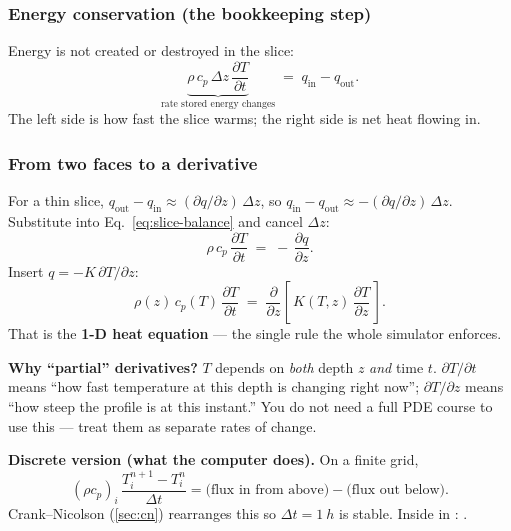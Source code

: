 \subsubsection{Energy conservation (the bookkeeping step)}

Energy is not created or destroyed in the slice:
\begin{equation}
  \underbrace{\rho\,c_p\,\Delta z\,\frac{\partial T}{\partial t}}_{\text{rate stored energy changes}}
  \;=\;
  q_\mathrm{in} - q_\mathrm{out}.
  \label{eq:slice-balance}
\end{equation}
The left side is how fast the slice warms; the right side is net heat flowing
in.

\subsubsection{From two faces to a derivative}

For a thin slice, $q_\mathrm{out} - q_\mathrm{in} \approx
(\partial q/\partial z)\,\Delta z$, so
$q_\mathrm{in} - q_\mathrm{out} \approx -(\partial q/\partial z)\,\Delta z$.
Substitute into Eq.~\eqref{eq:slice-balance} and cancel $\Delta z$:
\begin{equation}
  \rho\,c_p\,\frac{\partial T}{\partial t} \;=\; -\,\frac{\partial q}{\partial z}.
\end{equation}
Insert $q = -K\,\partial T/\partial z$:
\begin{equation}
  \rho(z)\,c_p(T)\,\frac{\partial T}{\partial t}
   \;=\; \frac{\partial}{\partial z}\!\left[\,K(T,z)\,\frac{\partial T}{\partial z}\,\right].
  \label{eq:heat}
\end{equation}
That is the \textbf{1-D heat equation} --- the single rule the whole simulator
enforces.

\begin{plainenglish}
\textbf{Why ``partial'' derivatives?} $T$ depends on \emph{both} depth $z$
\emph{and} time $t$. $\partial T/\partial t$ means ``how fast temperature at
this depth is changing right now''; $\partial T/\partial z$ means ``how steep
the profile is at this instant.'' You do not need a full PDE course to use
this --- treat them as separate rates of change.
\end{plainenglish}

\begin{plainenglish}
\textbf{Discrete version (what the computer does).} On a finite grid,
\begin{equation*}
  (\rho c_p)_i\,\frac{T_i^{n+1}-T_i^{n}}{\Delta t}
  = \text{(flux in from above)} - \text{(flux out below)}.
\end{equation*}
Crank--Nicolson (\autoref{sec:cn}) rearranges this so $\Delta t =
\SI{1}{h}$ is stable. Inside  in :
.
\end{plainenglish}

